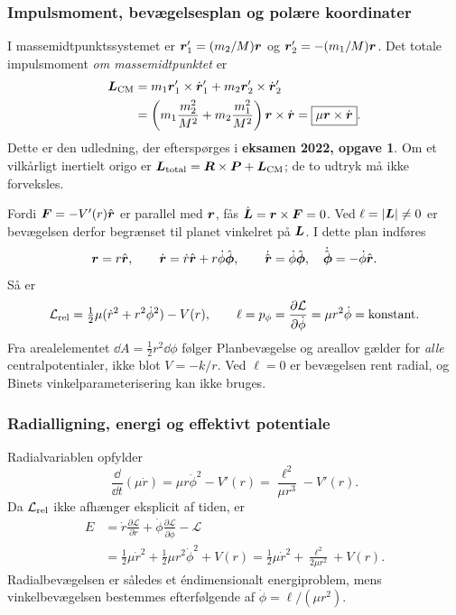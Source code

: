 \subsubsection*{Impulsmoment, bevægelsesplan og polære koordinater}
I massemidtpunktssystemet er $\boldsymbol{r}_1'=(m_2/M)\boldsymbol{r}$ og $\boldsymbol{r}_2'=-(m_1/M)\boldsymbol{r}$. Det totale impulsmoment \emph{om massemidtpunktet} er
\begin{align*}
\boldsymbol{L}_{\rm CM}&=m_1\boldsymbol{r}_1'\times\dot{\boldsymbol{r}}_1'
+m_2\boldsymbol{r}_2'\times\dot{\boldsymbol{r}}_2'\\
&=\left(m_1\frac{m_2^2}{M^2}+m_2\frac{m_1^2}{M^2}\right)
\boldsymbol{r}\times\dot{\boldsymbol{r}}
=\boxed{\mu\boldsymbol{r}\times\dot{\boldsymbol{r}}}.
\end{align*}
Dette er den udledning, der efterspørges i \textbf{eksamen 2022, opgave 1}. Om et vilkårligt inertielt origo er $\boldsymbol{L}_{\rm total}=\boldsymbol{R}\times\boldsymbol{P}+\boldsymbol{L}_{\rm CM}$; de to udtryk må ikke forveksles.

Fordi $\boldsymbol{F}=-V'(r)\hat{\boldsymbol{r}}$ er parallel med $\boldsymbol{r}$, fås $\dot{\boldsymbol{L}}=\boldsymbol{r}\times\boldsymbol{F}=0$. Ved $\ell=|\boldsymbol{L}|\ne0$ er bevægelsen derfor begrænset til planet vinkelret på $\boldsymbol{L}$. I dette plan indføres
\[
\boldsymbol{r}=r\hat{\boldsymbol{r}},\qquad
\dot{\boldsymbol{r}}=\dot r\hat{\boldsymbol{r}}+r\dot\phi\hat{\boldsymbol{\phi}},
\qquad
\dot{\hat{\boldsymbol{r}}}=\dot\phi\hat{\boldsymbol{\phi}},\quad
\dot{\hat{\boldsymbol{\phi}}}=-\dot\phi\hat{\boldsymbol{r}}.
\]
Så er
\[
\mathcal L_{\rm rel}=\tfrac12\mu(\dot r^2+r^2\dot\phi^2)-V(r),\qquad
\ell=p_\phi=\frac{\partial\mathcal L}{\partial\dot\phi}
=\mu r^2\dot\phi=\text{konstant}.
\]
Fra arealelementet $\dd A=\frac12r^2\dd\phi$ følger
Planbevægelse og areallov gælder for \emph{alle} centralpotentialer, ikke blot $V=-k/r$. Ved $\ell=0$ er bevægelsen rent radial, og Binets vinkelparameterisering kan ikke bruges.

\subsubsection*{Radialligning, energi og effektivt potentiale}
Radialvariablen opfylder
\[
\frac{\dd}{\dd t}(\mu\dot r)
=\mu r\dot\phi^2-V'(r)
=\frac{\ell^2}{\mu r^3}-V'(r).
\]
Da $\mathcal L_{\rm rel}$ ikke afhænger eksplicit af tiden, er
\begin{align*}
E&=\dot r\frac{\partial\mathcal L}{\partial\dot r}
+\dot\phi\frac{\partial\mathcal L}{\partial\dot\phi}-\mathcal L\\
&=\frac12\mu\dot r^2+\frac12\mu r^2\dot\phi^2+V(r)
=\frac12\mu\dot r^2+\frac{\ell^2}{2\mu r^2}+V(r).
\end{align*}
Radialbevægelsen er således et éndimensionalt energiproblem, mens vinkelbevægelsen bestemmes efterfølgende af $\dot\phi=\ell/(\mu r^2)$.

